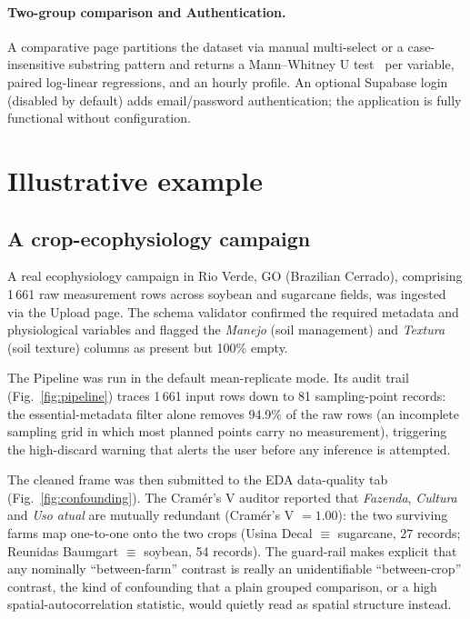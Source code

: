 \documentclass[preprint,12pt,a4paper]{elsarticle}
\begin{document}
\paragraph{Two-group comparison and Authentication.} A comparative page partitions the dataset via manual multi-select or a case-insensitive substring pattern and returns a Mann--Whitney U test~\cite{Mann1947} per variable, paired log-linear regressions, and an hourly profile. An optional Supabase login (disabled by default) adds email/password authentication; the application is fully functional without configuration.

\section{Illustrative example}\label{sec:examples}

\subsection{A crop-ecophysiology campaign}\label{sec:ex-physio}

A real ecophysiology campaign in Rio Verde, GO (Brazilian Cerrado), comprising 1\,661 raw measurement rows across soybean and sugarcane fields, was ingested via the Upload page. The schema validator confirmed the required metadata and physiological variables and flagged the \emph{Manejo} (soil management) and \emph{Textura} (soil texture) columns as present but 100\% empty.

The Pipeline was run in the default mean-replicate mode. Its audit trail (Fig.~\ref{fig:pipeline}) traces 1\,661 input rows down to 81 sampling-point records: the essential-metadata filter alone removes 94.9\% of the raw rows (an incomplete sampling grid in which most planned points carry no measurement), triggering the high-discard warning that alerts the user before any inference is attempted.

The cleaned frame was then submitted to the EDA data-quality tab (Fig.~\ref{fig:confounding}). The Cram\'er's V auditor reported that \emph{Fazenda}, \emph{Cultura} and \emph{Uso atual} are mutually redundant (Cram\'er's V $=1.00$): the two surviving farms map one-to-one onto the two crops (Usina Decal $\equiv$ sugarcane, 27 records; Reunidas Baumgart $\equiv$ soybean, 54 records). The guard-rail makes explicit that any nominally ``between-farm'' contrast is really an unidentifiable ``between-crop'' contrast, the kind of confounding that a plain grouped comparison, or a high spatial-autocorrelation statistic, would quietly read as spatial structure instead.
\end{document}
